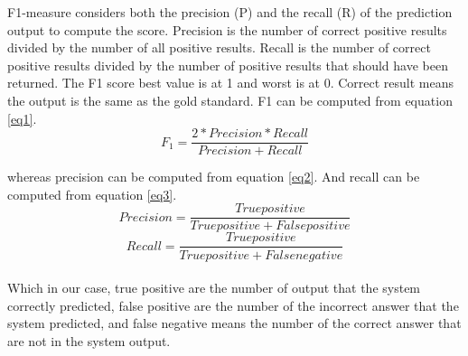  F1-measure considers both the precision (P) and the recall (R) of the prediction output to compute the score. Precision is the number of correct positive results divided by the number of all positive results. Recall is the number of correct positive results divided by the number of positive results that should have been returned. The F1 score best value is at 1 and worst is at 0. Correct result means the output is the same as the gold standard.
F1 can be computed from equation \ref{eq1}.
\begin{equation}
\label{eq1}
    F_1=\frac {2 * Precision * Recall}{Precision+Recall}
\end{equation}

whereas precision can be computed from equation \ref{eq2}. And recall can be computed from equation \ref{eq3}.
\begin{equation}
\label{eq2}
Precision = \frac{True positive}{True positive+False positive}
\end{equation}
\begin{equation}
\label{eq3}
Recall =\frac{True positive}{True positive+False negative}
\end{equation}		
\\
Which in our case, true positive are the number of output that the system correctly predicted, false positive are the number of the incorrect answer that the system predicted, and false negative means the number of the correct answer that are not in the system output.

